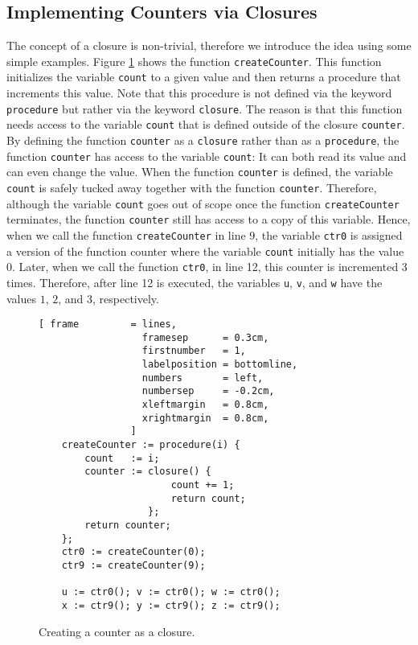 \subsection{Implementing Counters via Closures}
The concept of a closure is non-trivial, therefore we introduce the idea using some simple
examples.  Figure \ref{fig:counter-closure.stlx} shows the function
\texttt{createCounter}.  This function initializes the variable \texttt{count} to a given
value and then returns a procedure that increments this value.  Note that this procedure is not
defined via the keyword \texttt{procedure} but rather via the keyword \texttt{closure}.  The reason
is that this function needs access to the variable \texttt{count} that is defined outside of the
closure \texttt{counter}.  By defining the function \texttt{counter} as a \texttt{closure} rather
than as a \texttt{procedure},  the function \texttt{counter} has access to the variable \texttt{count}:
It can both read its value and can even change the value.  When the function \texttt{counter} is
defined, the variable \texttt{count} is safely tucked away together with the function
\texttt{counter}.  Therefore, although the variable \texttt{count} goes out of scope once the
function \texttt{createCounter} terminates, the function \texttt{counter} still has access
to a 
copy of this variable.  Hence, when we call the function \texttt{createCounter} in line 9, 
the variable \texttt{ctr0} is assigned a version of the function counter where the variable
\texttt{count} initially has the value 0.  Later, when we call the function \texttt{ctr0},
in line 12, this counter is incremented 3 times.  Therefore, after line 12 is executed,
the variables \texttt{u}, \texttt{v}, and \texttt{w} have the values $1$, $2$, and $3$,
respectively. 


\begin{figure}[!ht]
\centering
\begin{Verbatim}[ frame         = lines, 
                  framesep      = 0.3cm, 
                  firstnumber   = 1,
                  labelposition = bottomline,
                  numbers       = left,
                  numbersep     = -0.2cm,
                  xleftmargin   = 0.8cm,
                  xrightmargin  = 0.8cm,
                ]
    createCounter := procedure(i) {
        count   := i;
        counter := closure() {
                       count += 1;
                       return count;
                   };
        return counter;
    };   
    ctr0 := createCounter(0);
    ctr9 := createCounter(9);
    
    u := ctr0(); v := ctr0(); w := ctr0();
    x := ctr9(); y := ctr9(); z := ctr9();
\end{Verbatim}
\vspace*{-0.3cm}
\caption{Creating a counter as a closure.}
\label{fig:counter-closure.stlx}
\end{figure}

